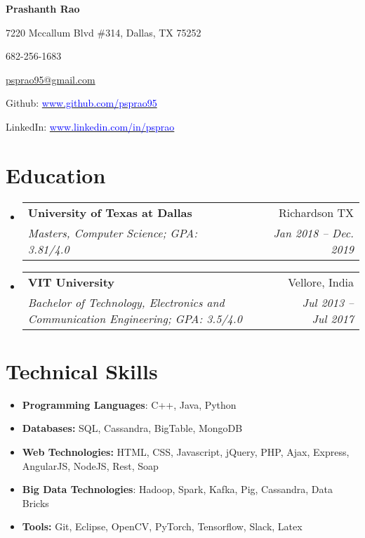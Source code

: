 \documentclass[letterpaper,11pt]{article}
\makeatletter
\newcommand{\resumeSubheading}[4]{
  \vspace{-1pt}\item
    \begin{tabular*}{0.97\textwidth}{l@{\extracolsep{\fill}}r}
      \textbf{#1} & #2 \\
      \textit{\small#3} & \textit{\small #4} \\
    \end{tabular*}\vspace{-5pt}
}
\newcommand{\resumeSubHeadingListStart}{\begin{itemize}[leftmargin=*]}
\newcommand{\resumeSubHeadingListEnd}{\end{itemize}}
\makeatother
\begin{document}
\begin{center}
  \textbf{\Huge Prashanth Rao}\\
  \vspace{0.05in}


    
    
    \begin{itemize*}
    \item7220 Mccallum Blvd \#314, Dallas, TX 75252
    \hspace{4in}
     \item  682-256-1683
     \hspace{1in}
     \item \href{mailto:psprao95@gmail.com}{psprao95@gmail.com}
    \end{itemize*}


  
  \begin{itemize*}
    \item  Github: \href{https://www.github.com/psprao95}{\textcolor{blue}{www.github.com/psprao95}}
     \item  LinkedIn: \href{https://www.linkedin.com/in/psprao}{\textcolor{blue}{www.linkedin.com/in/psprao}}
    \hspace{8in}
  
  
  \end{itemize*}
\end{center}

\section{Education}
  \resumeSubHeadingListStart
    \resumeSubheading
      {University of Texas at Dallas}{Richardson TX}
      {Masters, Computer Science;  GPA: 3.81/4.0}{Jan 2018 -- Dec. 2019}
    \resumeSubheading
      {VIT University}{Vellore, India}
      {Bachelor of Technology, Electronics and Communication Engineering;  GPA: 3.5/4.0}{Jul 2013 -- Jul 2017}
  \resumeSubHeadingListEnd



\section{Technical Skills}

\begin{itemize}[noitemsep,nolistsep,leftmargin=*]


\item \textbf{Programming Languages}: C++, Java, Python
\item \textbf{Databases:} SQL, Cassandra, BigTable, MongoDB
\item \textbf{Web Technologies:} HTML, CSS, Javascript, jQuery, PHP, Ajax, Express, AngularJS, NodeJS, Rest, Soap
 \item \textbf{Big Data Technologies}: Hadoop, Spark, Kafka, Pig, Cassandra, Data Bricks
\item \textbf{Tools:} Git, Eclipse, OpenCV,  PyTorch, Tensorflow, Slack, Latex
  \end{itemize}
 
\end{document}
